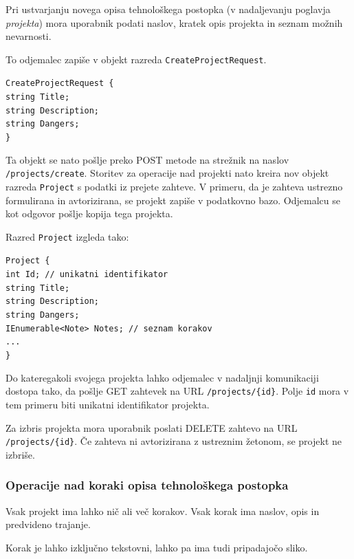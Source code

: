 \documentclass[a4paper, 12pt]{book}
\begin{document}
Pri ustvarjanju novega opisa tehnološkega postopka (v nadaljevanju poglavja \textit{projekta}) mora uporabnik podati naslov, kratek opis projekta in seznam možnih nevarnosti.

To odjemalec zapiše v objekt razreda \texttt{CreateProjectRequest}.

\noindent \texttt{CreateProjectRequest \{ \\
string Title; \\ 
string Description; \\
string Dangers; \\
\} }

\noindent Ta objekt se nato pošlje preko POST metode na strežnik na naslov \texttt{/projects/create}.
Storitev za operacije nad projekti nato kreira nov objekt razreda \texttt{Project} s podatki iz prejete zahteve.
V primeru, da je zahteva ustrezno formulirana in avtorizirana, se projekt zapiše v podatkovno bazo.
Odjemalcu se kot odgovor pošlje kopija tega projekta.

\noindent Razred \texttt{Project} izgleda tako:

\noindent \texttt{Project \{ \\
int Id; // unikatni identifikator \\
string Title; \\
string Description; \\
string Dangers; \\
IEnumerable<Note> Notes; // seznam korakov \\
... \\
\}
}


Do kateregakoli svojega projekta lahko odjemalec v nadaljnji komunikaciji dostopa tako, da pošlje GET zahtevek na URL \texttt{/projects/\{id\}}.
Polje \texttt{id} mora v tem primeru biti unikatni identifikator projekta.

Za izbris projekta mora uporabnik poslati DELETE zahtevo na URL \texttt{/projects/\{id\}}.
Če zahteva ni avtorizirana z ustreznim žetonom, se projekt ne izbriše.

\subsubsection{Operacije nad koraki opisa tehnološkega postopka}

Vsak projekt ima lahko nič ali več korakov.
Vsak korak ima naslov, opis in predvideno trajanje.

Korak je lahko izključno tekstovni, lahko pa ima tudi pripadajočo sliko.
\end{document}
